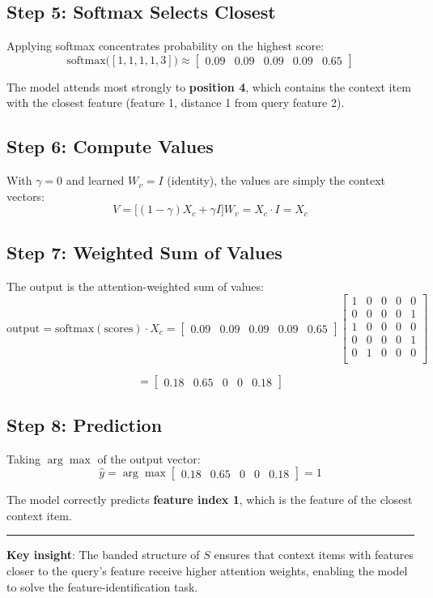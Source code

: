 \documentclass[12pt]{article}
\begin{document}
\subsection*{Step 5: Softmax Selects Closest}

Applying softmax concentrates probability on the highest score:
\[
\text{softmax}\bigl([1, 1, 1, 1, 3]\bigr) \approx \begin{bmatrix} 0.09 & 0.09 & 0.09 & 0.09 & \mathbf{0.65} \end{bmatrix}
\]

The model attends most strongly to \textbf{position 4}, which contains the context item with the closest feature (feature 1, distance 1 from query feature 2).

\subsection*{Step 6: Compute Values}

With $\gamma = 0$ and learned $W_v = I$ (identity), the values are simply the context vectors:
\[
V = \bigl[(1-\gamma) X_c + \gamma I\bigr] W_v = X_c \cdot I = X_c
\]

\subsection*{Step 7: Weighted Sum of Values}

The output is the attention-weighted sum of values:
\[
\text{output} = \text{softmax}(\text{scores}) \cdot X_c = \begin{bmatrix} 0.09 & 0.09 & 0.09 & 0.09 & 0.65 \end{bmatrix}
\begin{bmatrix}
1 & 0 & 0 & 0 & 0 \\
0 & 0 & 0 & 0 & 1 \\
1 & 0 & 0 & 0 & 0 \\
0 & 0 & 0 & 0 & 1 \\
0 & 1 & 0 & 0 & 0 \\
\end{bmatrix}
\]

\[
= \begin{bmatrix} 0.18 & \mathbf{0.65} & 0 & 0 & 0.18 \end{bmatrix}
\]

\subsection*{Step 8: Prediction}

Taking $\arg\max$ of the output vector:
\[
\hat{y} = \arg\max \begin{bmatrix} 0.18 & \mathbf{0.65} & 0 & 0 & 0.18 \end{bmatrix} = 1
\]

The model correctly predicts \textbf{feature index 1}, which is the feature of the closest context item.

\vspace{1em}
\hrule
\vspace{1em}

\textbf{Key insight}: The banded structure of $S$ ensures that context items with features closer to the query's feature receive higher attention weights, enabling the model to solve the feature-identification task.
\end{document}
